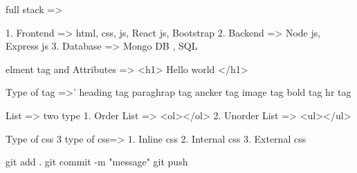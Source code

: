 full stack => 

1. Frontend => html, css, js, React js, Bootstrap
2. Backend => Node js, Express js
3. Database => Mongo DB , SQL


elment tag and Attributes =>
<h1> Hello world </h1>

Type of  tag =>'
heading tag
paraghrap tag
ancker tag
image tag
bold tag
hr tag

List => two type 
1. Order List  => <ol></ol>
2. Unorder List => <ul></ul>


Type of css
3 type of css=>
1. Inline css
2. Internal css
3. External css




git add .
git commit -m "message"
git push